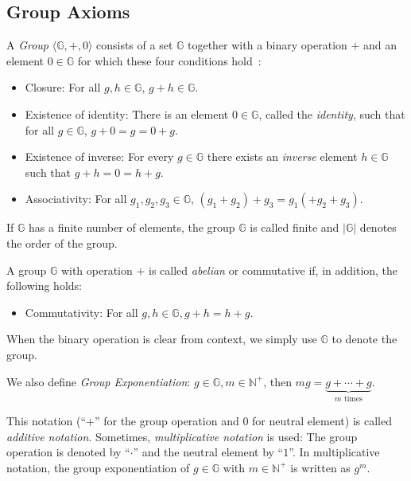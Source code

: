\subsection{Group Axioms}\label{sec:group}
\begin{definition} A \emph{Group} $\langle \mathbb{G}, +, 0 \rangle$ consists of a set $\mathbb{G}$ together with a binary operation $+$ and an element $0 \in \mathbb{G}$ for which these four conditions hold~\cite{katz_introduction_2015}:
    \begin{itemize}
        \item Closure: For all $g, h \in \mathbb{G}$, $g + h \in \mathbb{G}$.
        \item Existence of identity: There is an element $0 \in \mathbb{G}$, called the \emph{identity}, such that for all $g \in \mathbb{G}$, $g + 0 = g = 0 + g$.
        \item Existence of inverse: For every $g \in \mathbb{G}$ there exists an \emph{inverse} element $h \in \mathbb{G}$ such that $g + h = 0 = h + g$.
        \item Associativity: For all $g_1, g_2, g_3 \in \mathbb{G}$, $(g_1 + g_2) + g_3 = g_1 (+ g_2 + g_3)$.
    \end{itemize}
    If $\mathbb{G}$ has a finite number of elements, the group $\mathbb{G}$ is called finite and $|\mathbb{G}|$ denotes the order of the group.

    A group $\mathbb{G}$ with operation $+$ is called \emph{abelian} or commutative if, in addition, the following holds:
    \begin{itemize}
        \item Commutativity: For all $g, h \in \mathbb{G}, g + h = h + g$.
    \end{itemize}
    When the binary operation is clear from context, we simply use $\mathbb{G}$ to denote the group.

    We also define \emph{Group Exponentiation}: $g \in \mathbb{G}, m \in \mathbb{N}^+$, then $mg = \underbrace{g + \cdots + g}_{m \text{ times}}$.
\end{definition}


This notation (``$+$'' for the group operation and $0$ for neutral element) is called \emph{additive notation}.
Sometimes, \emph{multiplicative notation} is used: The group operation is denoted by ``$\cdot$'' and the neutral element by ``$1$''.
In multiplicative notation, the group exponentiation of $g \in \mathbb{G}$ with $m \in \mathbb{N}^+$ is written as $g^m$.

